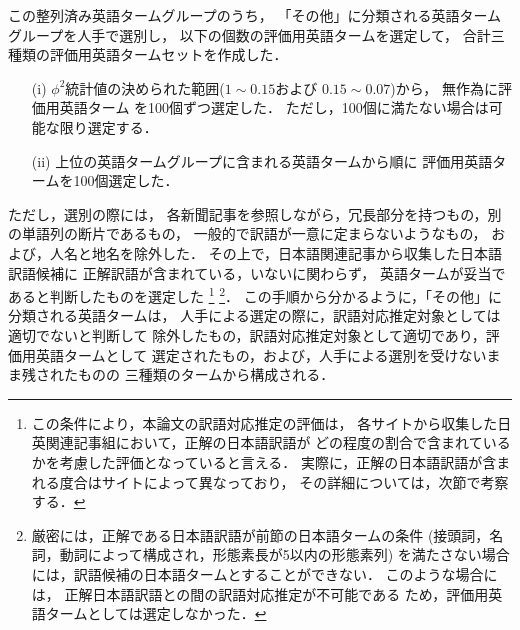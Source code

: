 この整列済み英語タームグループのうち，
「その他」に分類される英語タームグループを人手で選別し，
以下の個数の評価用英語タームを選定して，
合計三種類の評価用英語タームセットを作成した．
\begin{enumerate}
\item[(i)] $\phi^2$統計値の決められた範囲($1\sim0.15$および
	   \hspace*{0cm}
	   $0.15\sim0.07$)から，
	   無作為に評価用英語ターム
	   \hspace*{0cm}を100個ずつ選定した．
	   ただし，100個に満たない場合は可能な限り選定する．
\item[(ii)] 上位の英語タームグループに含まれる英語タームから順に
	   評価用英語タームを100個選定した．
\end{enumerate}
ただし，選別の際には，
各新聞記事を参照しながら，冗長部分を持つもの，別の単語列の断片であるもの，
一般的で訳語が一意に定まらないようなもの，
および，人名と地名を除外した．
その上で，日本語関連記事から収集した日本語訳語候補に
正解訳語が含まれている，いないに関わらず，
英語タームが妥当であると判断したものを選定した
\footnote{
  この条件により，本論文の訳語対応推定の評価は，
  各サイトから収集した日英関連記事組において，正解の日本語訳語が
  どの程度の割合で含まれているかを考慮した評価となっていると言える．
  実際に，正解の日本語訳語が含まれる度合はサイトによって異なっており，
  その詳細については，次節で考察する．
}
\footnote{
  厳密には，正解である日本語訳語が前節の日本語タームの条件
  (接頭詞，名詞，動詞によって構成され，形態素長が5以内の形態素列)
  を満たさない場合には，訳語候補の日本語タームとすることができない．
  このような場合には，
  正解日本語訳語との間の訳語対応推定が不可能である
  ため，評価用英語タームとしては選定しなかった．
}．
この手順から分かるように，「その他」に分類される英語タームは，
人手による選定の際に，訳語対応推定対象としては適切でないと判断して
除外したもの，訳語対応推定対象として適切であり，評価用英語タームとして
選定されたもの，および，人手による選別を受けないまま残されたものの
三種類のタームから構成される．

